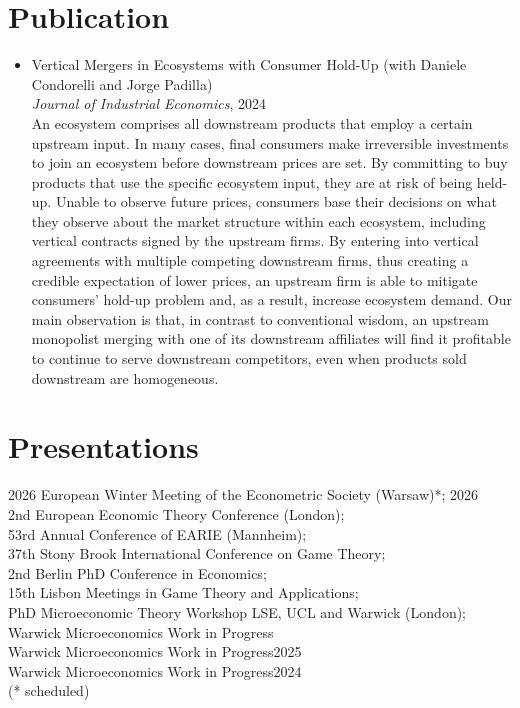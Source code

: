 \documentclass[11pt]{article}
\newlength{\oneli}
\begin{document}
\section*{\textbf{Publication}}
\begin{itemize}[leftmargin=0em, nosep, itemsep=4pt]
\item 
{Vertical Mergers in Ecosystems with Consumer Hold-Up}
(with Daniele Condorelli and Jorge Padilla)\\
\textit{Journal of Industrial Economics}, 2024\\[\oneli]
An ecosystem comprises all downstream products that employ a certain upstream input. In many cases, final consumers make irreversible investments to join an ecosystem before downstream prices are set. By committing to buy products that use the specific ecosystem input, they are at risk of being held-up. Unable to observe future prices, consumers base their decisions on what they observe about the market structure within each ecosystem, including vertical contracts signed by the upstream firms. By entering into vertical agreements with multiple competing downstream firms, thus creating a credible expectation of lower prices, an upstream firm is able to mitigate consumers' hold-up problem and, as a result, increase ecosystem demand. Our main observation is that, in contrast to conventional wisdom, an upstream monopolist merging with one of its downstream affiliates will find it profitable to continue to serve downstream competitors,  even when products sold downstream are homogeneous. 
\end{itemize} 



\setlength{\leftskip}{0em}
\section*{Presentations}
2026 European Winter Meeting of the Econometric Society (Warsaw)*;		\hfill 2026\\
2nd European Economic Theory Conference (London);\\
53rd Annual Conference of EARIE (Mannheim);\\
37th Stony Brook International Conference on Game Theory;\\
2nd Berlin PhD Conference in Economics;\\
15th Lisbon Meetings in Game Theory and Applications;\\
PhD Microeconomic Theory Workshop LSE, UCL and Warwick (London);\\
Warwick Microeconomics Work in Progress\\ 
Warwick Microeconomics Work in Progress\hfill 2025\\
Warwick Microeconomics Work in Progress\hfill 2024\\
(* scheduled)
\end{document}
